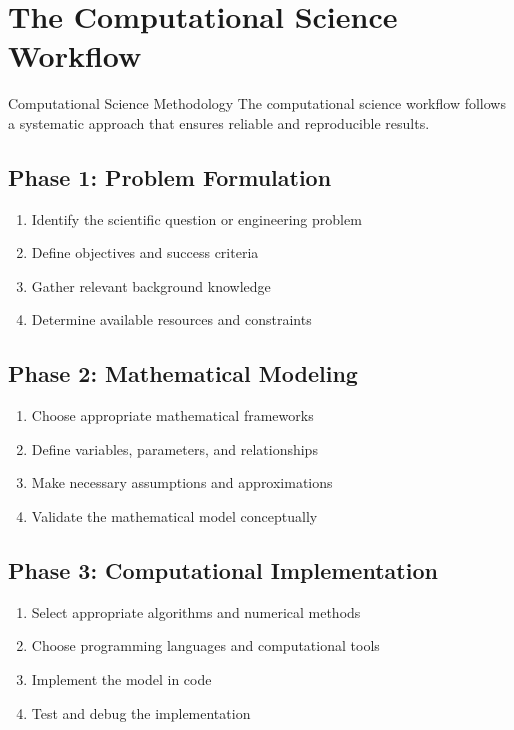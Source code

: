 \section{The Computational Science Workflow}

\begin{conceptcard}{Computational Science Methodology}
The computational science workflow follows a systematic approach that ensures reliable and reproducible results.
\end{conceptcard}

\subsection{Phase 1: Problem Formulation}
\begin{enumerate}
  \item Identify the scientific question or engineering problem
  \item Define objectives and success criteria
  \item Gather relevant background knowledge
  \item Determine available resources and constraints
\end{enumerate}

\subsection{Phase 2: Mathematical Modeling}
\begin{enumerate}
  \item Choose appropriate mathematical frameworks
  \item Define variables, parameters, and relationships
  \item Make necessary assumptions and approximations
  \item Validate the mathematical model conceptually
\end{enumerate}

\subsection{Phase 3: Computational Implementation}
\begin{enumerate}
  \item Select appropriate algorithms and numerical methods
  \item Choose programming languages and computational tools
  \item Implement the model in code
  \item Test and debug the implementation
\end{enumerate}

